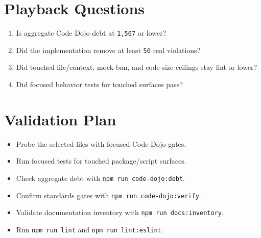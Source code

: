 \section{Playback Questions}\label{record-225-playback-questions}

\begin{enumerate}
\def\labelenumi{\arabic{enumi}.}
\tightlist
\item
  Is aggregate Code Dojo debt at \texttt{1\allowbreak{},\allowbreak{}5\allowbreak{}6\allowbreak{}7} or lower?
\item
  Did the implementation remove at least \texttt{5\allowbreak{}0} real violations?
\item
  Did touched file/context, mock-ban, and code-size ceilings stay flat or lower?
\item
  Did focused behavior tests for touched surfaces pass?
\end{enumerate}

\section{Validation Plan}\label{record-225-validation-plan}

\begin{itemize}
\tightlist
\item
  Probe the selected files with focused Code Dojo gates.
\item
  Run focused tests for touched package/script surfaces.
\item
  Check aggregate debt with \texttt{n\allowbreak{}p\allowbreak{}m\allowbreak{} \allowbreak{}r\allowbreak{}u\allowbreak{}n\allowbreak{} \allowbreak{}c\allowbreak{}o\allowbreak{}d\allowbreak{}e\allowbreak{}-\allowbreak{}d\allowbreak{}o\allowbreak{}j\allowbreak{}o\allowbreak{}:\allowbreak{}d\allowbreak{}e\allowbreak{}b\allowbreak{}t}.
\item
  Confirm standards gates with \texttt{n\allowbreak{}p\allowbreak{}m\allowbreak{} \allowbreak{}r\allowbreak{}u\allowbreak{}n\allowbreak{} \allowbreak{}c\allowbreak{}o\allowbreak{}d\allowbreak{}e\allowbreak{}-\allowbreak{}d\allowbreak{}o\allowbreak{}j\allowbreak{}o\allowbreak{}:\allowbreak{}v\allowbreak{}e\allowbreak{}r\allowbreak{}i\allowbreak{}f\allowbreak{}y}.
\item
  Validate documentation inventory with \texttt{n\allowbreak{}p\allowbreak{}m\allowbreak{} \allowbreak{}r\allowbreak{}u\allowbreak{}n\allowbreak{} \allowbreak{}d\allowbreak{}o\allowbreak{}c\allowbreak{}s\allowbreak{}:\allowbreak{}i\allowbreak{}n\allowbreak{}v\allowbreak{}e\allowbreak{}n\allowbreak{}t\allowbreak{}o\allowbreak{}r\allowbreak{}y}.
\item
  Run \texttt{n\allowbreak{}p\allowbreak{}m\allowbreak{} \allowbreak{}r\allowbreak{}u\allowbreak{}n\allowbreak{} \allowbreak{}l\allowbreak{}i\allowbreak{}n\allowbreak{}t} and \texttt{n\allowbreak{}p\allowbreak{}m\allowbreak{} \allowbreak{}r\allowbreak{}u\allowbreak{}n\allowbreak{} \allowbreak{}l\allowbreak{}i\allowbreak{}n\allowbreak{}t\allowbreak{}:\allowbreak{}e\allowbreak{}s\allowbreak{}l\allowbreak{}i\allowbreak{}n\allowbreak{}t}.
\end{itemize}

